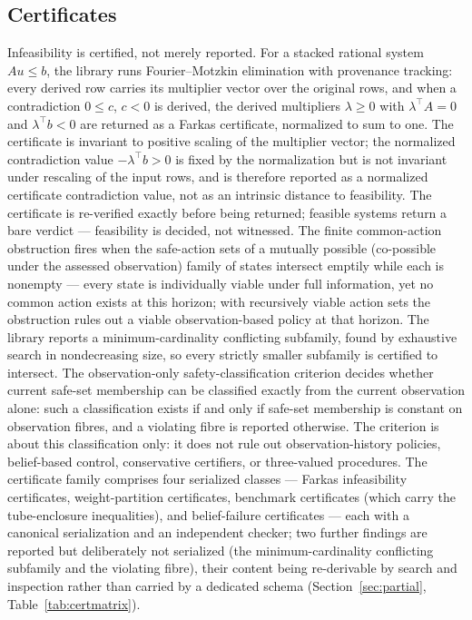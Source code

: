 \documentclass[3p,11pt]{elsarticle}
\begin{document}
\subsection{Certificates}\label{sec:certificates}

Infeasibility is certified, not merely reported. For a stacked rational
system $A u \leq b$, the library runs Fourier--Motzkin elimination with
provenance tracking: every derived row carries its multiplier vector over
the original rows, and when a contradiction $0 \leq c$, $c < 0$ is derived,
the derived multipliers $\lambda \geq 0$ with $\lambda^{\top} A = 0$ and
$\lambda^{\top} b < 0$ are returned as a Farkas certificate, normalized to
sum to one. The certificate is invariant to positive scaling of the
multiplier vector; the normalized contradiction value
$-\lambda^{\top} b > 0$ is fixed by the normalization but is not
invariant under rescaling of the input rows, and is therefore reported
as a normalized certificate contradiction value, not as an intrinsic
distance to feasibility. The certificate is
re-verified exactly before being returned; feasible systems return a
bare verdict --- feasibility is decided, not witnessed. The finite
common-action obstruction fires when the safe-action sets of a mutually
possible (co-possible under the assessed observation) family of states
intersect emptily while each is nonempty --- every state is individually
viable under full information, yet no common action exists at this
horizon; with recursively viable action sets the obstruction rules out a
viable observation-based policy at that horizon. The library reports a
minimum-cardinality conflicting subfamily, found by exhaustive search in
nondecreasing size, so every strictly smaller subfamily is certified to
intersect. The observation-only safety-classification criterion decides
whether current safe-set membership can be classified exactly from the
current observation alone: such a classification exists if and only if
safe-set membership is constant on observation fibres, and a violating
fibre is reported otherwise. The criterion is about this classification
only: it does not rule out observation-history policies, belief-based
control, conservative certifiers, or three-valued procedures. The
certificate family comprises four serialized classes --- Farkas
infeasibility certificates, weight-partition certificates, benchmark
certificates (which carry the tube-enclosure inequalities), and
belief-failure certificates --- each with a canonical serialization and
an independent checker; two further findings are reported but
deliberately not serialized (the minimum-cardinality conflicting
subfamily and the violating fibre), their content being re-derivable by
search and inspection rather than carried by a dedicated schema
(Section~\ref{sec:partial}, Table~\ref{tab:certmatrix}).
\end{document}
